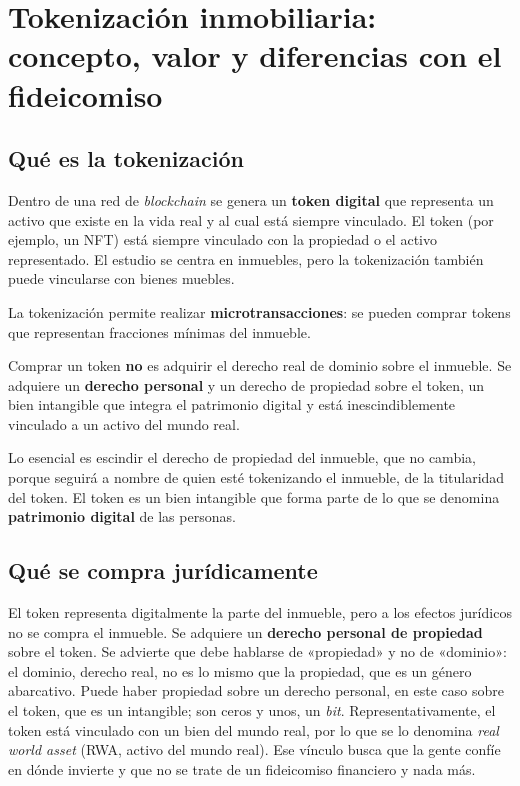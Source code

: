 \documentclass[12pt,oneside]{book}
\begin{document}
\chapter[Tokenización inmobiliaria: concepto y valor]{Tokenización inmobiliaria: concepto, valor y diferencias con el fideicomiso}

\section{Qué es la tokenización}

Dentro de una red de \textit{blockchain} se genera un \textbf{token digital} que representa un activo que existe en la vida real y al cual está siempre vinculado. El token (por ejemplo, un NFT) está siempre vinculado con la propiedad o el activo representado. El estudio se centra en inmuebles, pero la tokenización también puede vincularse con bienes muebles.

La tokenización permite realizar \textbf{microtransacciones}: se pueden comprar tokens que representan fracciones mínimas del inmueble.

\begin{important}
Comprar un token \textbf{no} es adquirir el derecho real de dominio sobre el inmueble. Se adquiere un \textbf{derecho personal} y un derecho de propiedad sobre el token, un bien intangible que integra el patrimonio digital y está inescindiblemente vinculado a un activo del mundo real.
\end{important}

Lo esencial es escindir el derecho de propiedad del inmueble, que no cambia, porque seguirá a nombre de quien esté tokenizando el inmueble, de la titularidad del token. El token es un bien intangible que forma parte de lo que se denomina \textbf{patrimonio digital} de las personas.

\section{Qué se compra jurídicamente}

El token representa digitalmente la parte del inmueble, pero a los efectos jurídicos no se compra el inmueble. Se adquiere un \textbf{derecho personal de propiedad} sobre el token. Se advierte que debe hablarse de «propiedad» y no de «dominio»: el dominio, derecho real, no es lo mismo que la propiedad, que es un género abarcativo. Puede haber propiedad sobre un derecho personal, en este caso sobre el token, que es un intangible; son ceros y unos, un \textit{bit}. Representativamente, el token está vinculado con un bien del mundo real, por lo que se lo denomina \textit{real world asset} (RWA, activo del mundo real). Ese vínculo busca que la gente confíe en dónde invierte y que no se trate de un fideicomiso financiero y nada más.
\end{document}
